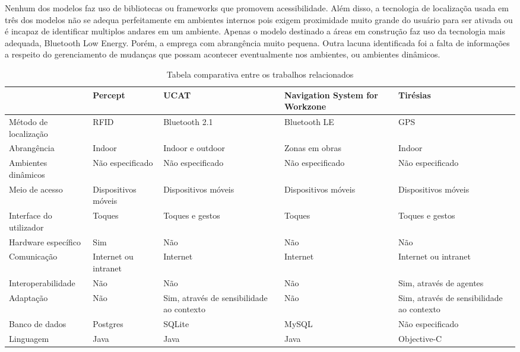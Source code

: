 \documentclass[twoside,english,brazilian]{UNISINOSartigo}
\begin{document}
Nenhum dos modelos faz uso de bibliotecas ou frameworks que promovem acessibilidade. Além disso, a tecnologia de localizaçõa usada em três dos modelos não se adequa perfeitamente em ambientes internos pois exigem proximidade muito grande do usuário para ser ativada ou é incapaz de identificar multiplos andares em um ambiente. Apenas o modelo destinado a áreas em construção faz uso da tecnologia mais adequada, Bluetooth Low Energy. Porém, a emprega com abrangência muito pequena. Outra lacuna identificada foi a falta de informações a respeito do gerenciamento de mudanças que possam acontecer eventualmente nos ambientes, ou ambientes dinâmicos.

\begin{table}
	\caption{Tabela comparativa entre os trabalhos relacionados}
	\label{tab:trabalalhosRelacionados}
	\centering%
	\begin{minipage}{1\textwidth}
		\begin{adjustbox}{max width=\textwidth}
		\begin{tabular}{ p{3cm} | p{3cm} | p{3cm} | p{3cm} | p{3cm} }
 	\hline
 	& Percept & UCAT & Navigation System for Workzone & Tirésias \\ \hline
	Método de localização & RFID & Bluetooth 2.1 & Bluetooth LE & GPS \\ \hline
	Abrangência & Indoor & Indoor e outdoor & Zonas em obras & Indoor \\ \hline
	Ambientes dinâmicos & Não especificado & Não especificado & Não especificado & Não especificado \\ \hline
	Meio de acesso & Dispositivos móveis & Dispositivos móveis & Dispositivos móveis & Dispositivos móveis \\ \hline
	Interface do utilizador & Toques & Toques e gestos & Toques & Toques e gestos \\ \hline
	Hardware específico & Sim & Não & Não & Não \\ \hline
	Comunicação & Internet ou intranet & Internet & Internet & Internet ou intranet \\ \hline
	Interoperabilidade & Não & Não & Não & Sim, através de agentes \\ \hline
	Adaptação & Não & Sim, através de sensibilidade ao contexto & Não & Sim, através de sensibilidade ao contexto \\ \hline
	Banco de dados & Postgres & SQLite & MySQL & Não especificado \\ \hline
	Linguagem & Java & Java & Java & Objective-C \\ \hline

\end{tabular}
\end{adjustbox}
\end{minipage}
\end{table}
\end{document}
